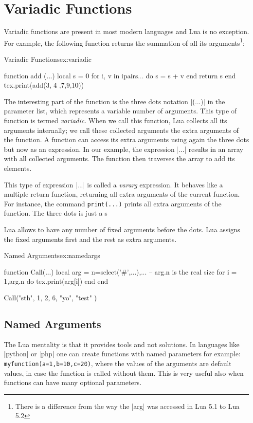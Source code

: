 \chapter{Variadic Functions}

Variadic functions are present in most modern languages and Lua is no exception. For example, the following function returns the summation of all its arguments\footnote{There is a difference from the way the |arg| was accessed in Lua 5.1 to Lua 5.2}:

\begin{texexample}{Variadic Functions}{ex:variadic}
\begin{luacode*}
function add (...)
	local s = 0
	for i, v in ipairs{...} do
   		s = s + v
	end
	return s
end
tex.print(add(3, 4 ,7,9,10))
\end{luacode*}
\end{texexample}

The interesting part of the function is the three dots notation |(...)| in the parameter list, which represents a variable number of arguments. This type of function is termed \emph{variadic}.
When we call this function, Lua collects all its arguments internally; we call
these collected arguments the extra arguments of the function. A function can
access its extra arguments using again the three dots but now as an expression.
In our example, the expression |{...}| results in an array with all collected
arguments. The function then traverses the array to add its elements.

This type of  expression |...| is called  a \emph{vararg} expression. It behaves like a multiple
return function, returning all extra arguments of the current function. For
instance, the command \texttt{print(...)} prints all extra arguments of the function. The three dots is just a s

Lua allows to have any number of fixed arguments before the dots. Lua assigns the fixed arguments first and the rest as extra arguments.

\begin{texexample}{Named Arguments}{ex:namedargs}
\begin{luacode*}
function Call(...)
   local arg = {n=select('#',...),...}
  -- arg.n is the real size
  for i = 1,arg.n do
    tex.print(arg[i])
  end
 end

Call("sth", 1, 2, 6, "yo", "test" )	

\end{luacode*}
\end{texexample}


\section{Named Arguments}

The Lua mentality is that it provides tools and not solutions. In languages like |python| or |php| one can create functions with named parameters for example: \texttt{myfunction(a=1,b=10,c=20)}, where the values of the arguments are default values, in case the function is called without them. This is very useful also when functions can have many optional parameters.








